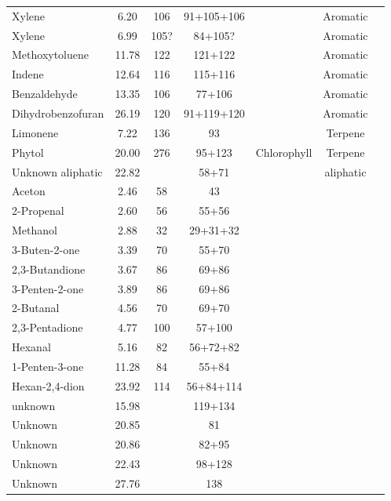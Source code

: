 \begin{table}[h!]
\begin{center}
{\begin{tabular}{lcccccc}
Xylene & 6.20 & 106 & 91+105+106 &&Aromatic\\ 
Xylene & 6.99 & 105? & 84+105? &&Aromatic\\ 
Methoxytoluene & 11.78 & 122 & 121+122 &&Aromatic\\ 
Indene & 12.64 & 116 & 115+116 &&Aromatic\\ 
Benzaldehyde & 13.35 & 106 & 77+106 &&Aromatic\\ 
Dihydrobenzofuran & 26.19 & 120 & 91+119+120 &  & Aromatic \\ 
Limonene & 7.22 & 136 & 93 && Terpene \\ 
Phytol & 20.00 & 276 & 95+123 & Chlorophyll & Terpene \\ 
Unknown aliphatic & 22.82 && 58+71 && aliphatic \\ 
Aceton & 2.46 & 58 & 43 &  &  \\ 
2-Propenal & 2.60 & 56 & 55+56 &  &\\ 
Methanol & 2.88 & 32 & 29+31+32 &  &\\ 
3-Buten-2-one & 3.39 & 70 & 55+70 &  &\\ 
2,3-Butandione & 3.67 & 86 & 69+86 &&\\ 
3-Penten-2-one & 3.89 & 86 & 69+86 &&\\ 
2-Butanal & 4.56 & 70 & 69+70 &&\\ 
2,3-Pentadione & 4.77 & 100 & 57+100 &&\\ 
Hexanal & 5.16 & 82 & 56+72+82 &&\\ 
1-Penten-3-one & 11.28 & 84 & 55+84 &&\\ 
Hexan-2,4-dion & 23.92 & 114 & 56+84+114 &&  \\ 
unknown & 15.98 && 119+134 &&\\ 
Unknown & 20.85 && 81 &&\\ 
Unknown & 20.86 && 82+95 &&\\ 
Unknown & 22.43 && 98+128 &&\\ 
Unknown & 27.76 && 138 &&\\ 
   \hline
\end{tabular}
}
\end{center}
\end{table}
